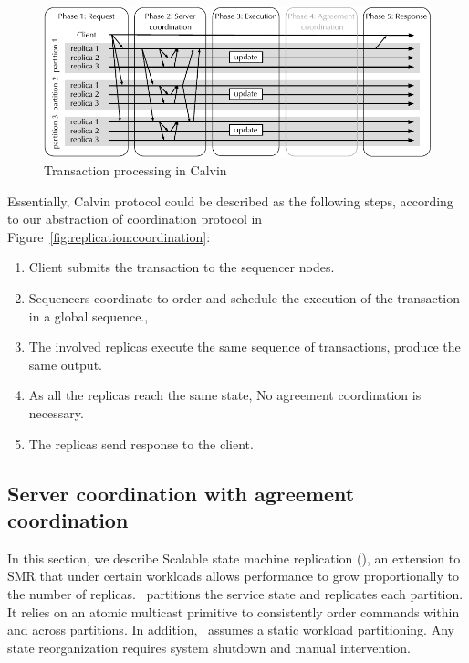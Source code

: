 \begin{figure}
  \begin{minipage}[b]{1.0\linewidth}
  \centering
        \includegraphics[width=1\linewidth]{figures/calvin}
  \end{minipage}
  \caption{Transaction processing in Calvin}
  \label{fig:calvin}
\end{figure}

Essentially, Calvin protocol could be described as the following steps, according to
our abstraction of coordination protocol in
Figure~\ref{fig:replication:coordination}:

\begin{enumerate}
  \item Client submits the transaction to the sequencer nodes.
  \item Sequencers coordinate to order and schedule the execution of the transaction in a global sequence.,
  \item The involved replicas execute the same sequence of transactions, produce the same output.
  \item As all the replicas reach the same state, No agreement coordination is necessary.
  \item The replicas send response to the client.
\end{enumerate}

\subsection{Server coordination with agreement coordination}
\label{sec:ssmr}
In this section, we describe Scalable state machine replication (\ssmr), an
extension to SMR that under certain workloads allows performance to grow
proportionally to the number of replicas. \ssmr\ partitions the service state
and replicates each partition. It relies on an atomic multicast primitive to
consistently order commands within and across partitions. In addition, \ssmr\
assumes a static workload partitioning. Any state reorganization requires system
shutdown and manual intervention.

